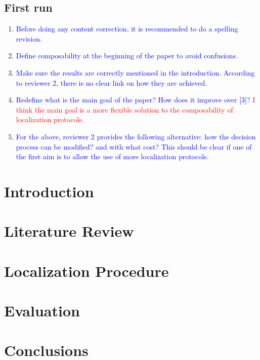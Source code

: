 \documentclass[conference]{IEEEtran}
\begin{document}
\subsection{First run}
\begin{enumerate}
	\item\textcolor{blue}{Before doing any content correction, it is recommended to do a spelling revision.}
	\item\textcolor{blue}{Define composability at the beginning of the paper to avoid confusions.}
	\item\textcolor{blue}{Make sure the results are correctly mentioned in the introduction. According to reviewer 2, there is no clear link on how they are achieved.}
	\item\textcolor{blue}{Redefine what is the main goal of the paper? How does it improve over [3]?} \textcolor{red}{I think the main goal is a more flexible solution to the composability of localization protocols.}
	\item\textcolor{blue}{For the above, reviewer 2 provides the following alternative: how the decision process can be modified? and with what cost? This should be clear if one of the first aim is to allow the use of more localization protocols.}
	
\end{enumerate}


\section{Introduction} \label{introduction}
  
  
\section{Literature Review} \label{literature}
  
  
\section{Localization Procedure} \label{locProc}
  

\section{Evaluation} \label{simulation}
  

\section{Conclusions} \label{conclusions}
  
  


  
\end{document}
